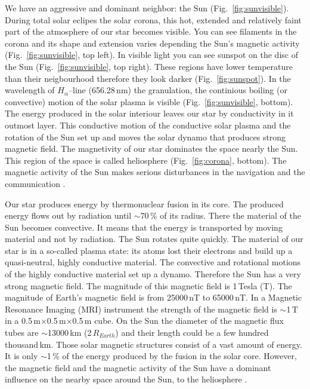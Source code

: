 \documentclass[sn-aps]{sn-jnl}%
\begin{document}
We have an aggressive and dominant neighbor: the Sun (Fig.~\ref{fig:sunvisible}). During total solar eclipes the solar corona, this hot, extended and relatively faint part of the atmosphere of our star becomes visible. You can see filaments in the corona and its shape and extension varies depending the Sun's magnetic activity (Fig.~\ref{fig:sunvisible}, top left). In visible light you can see sunspot on the disc of the Sun (Fig.~\ref{fig:sunvisible}, top right). These regions have lower temperature than their neigbourhood therefore they look darker (Fig.~\ref{fig:sunspot}). In the wavelength of $H_{\alpha}$--line (656.28\,nm) the granulation, the continious boiling (or convective) motion of the solar plasma is visible (Fig.~\ref{fig:sunvisible}, bottom). The energy produced in the solar interiour leaves our star by conductivity in it outmost layer. This conductive motion of the conductive solar plasma and the rotation of the Sun set up and moves the solar dynamo that produces strong magnetic field. The magnetivity of our star dominates the space nearly the Sun. This region of the space is called heliosphere (Fig.~\ref{fig:corona}, bottom). The magnetic activity of the Sun makes serious disturbances in the navigation and the communication \cite{scherer05:_space_weath,stix04:_sun_introd}. 

Our star produces energy by thermonuclear fusion in its core. The produced energy flows out by radiation until $\sim$70\,\% of its radius. There the material of the Sun becomes convective. It means that the energy is transported by moving material and not by radiation. The Sun rotates quite quickly. The material of our star is in a so-called plasma state: its atoms lost their electrons and build up a quasi-neutral, highly conductive material. The convective and rotational motions of the highly conductive material set up a dynamo. Therefore the Sun has a very strong magnetic field. The magnitude of this magnetic field is 1\,Tesla (T). The magnitude of Earth's magnetic field is from 25000\,nT to 65000\,nT. In a Magnetic Resonance Imaging (MRI) instrument the strength of the magnetic field is $\sim$1\,T in a 0.5\,m$\times$0.5\,m$\times$0.5\,m cube. On the Sun the diameter of the magnetic flux tubes are $\sim$13000\,km (2\,$R_{Earth}$) and their length could be a few hundred thousand\,km. Those solar magnetic structures consist of a vast amount of energy. It is only $\sim$1\,\% of the energy produced by the fusion in the solar core. However, the magnetic field and the magnetic activity of the Sun have a dominant influence on the nearby space around the Sun, to the heliosphere \cite{scherer05:_space_weath,stix04:_sun_introd}.
\end{document}

